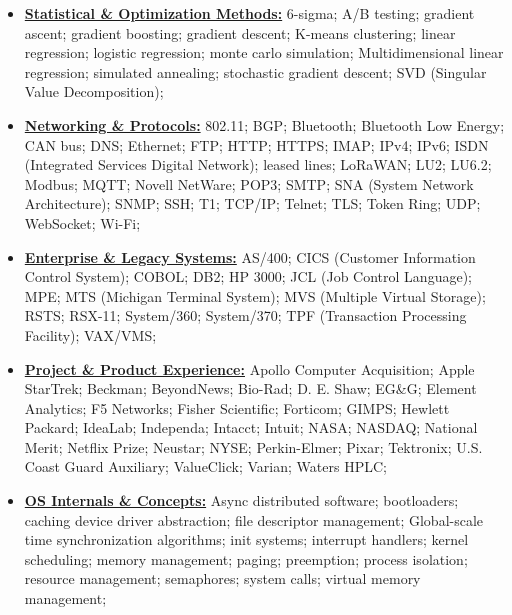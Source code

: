 \documentclass[letterpaper,11pt]{article}
\begin{document}
{\begin{itemize}[leftmargin=0.1in, label={}, itemsep=0pt, parsep=0pt, topsep=0pt, partopsep=0pt]
HDMI;
jitter;
latency;
NVENC;
OpenGL;
sound card drivers;
VGA drivers;
Video Capture;
Video Capture Card Drivers;
Video Capture Cards;
Video Compression;
Video Decompression;
video pipeline;
video transcoding;
WebRTC;
YUV;
\item
\textbf{\underline{Statistical \& Optimization Methods:}} \hspace{0pt}
6-sigma;
A/B testing;
gradient ascent;
gradient boosting;
gradient descent;
K-means clustering;
linear regression;
logistic regression;
monte carlo simulation;
Multidimensional linear regression;
simulated annealing;
stochastic gradient descent;
SVD (Singular Value Decomposition);
\item
\textbf{\underline{Networking \& Protocols:}} \hspace{0pt}
802.11;
BGP;
Bluetooth;
Bluetooth Low Energy;
CAN bus;
DNS;
Ethernet;
FTP;
HTTP;
HTTPS;
IMAP;
IPv4;
IPv6;
ISDN (Integrated Services Digital Network);
leased lines;
LoRaWAN;
LU2;
LU6.2;
Modbus;
MQTT;
Novell NetWare;
POP3;
SMTP;
SNA (System Network Architecture);
SNMP;
SSH;
T1;
TCP/IP;
Telnet;
TLS;
Token Ring;
UDP;
WebSocket;
Wi-Fi;

\item
\textbf{\underline{Enterprise \& Legacy Systems:}} \hspace{0pt}
AS/400;
CICS (Customer Information Control System);
COBOL;
DB2;
HP 3000;
JCL (Job Control Language);
MPE;
MTS (Michigan Terminal System);
MVS (Multiple Virtual Storage);
RSTS;
RSX-11;
System/360;
System/370;
TPF (Transaction Processing Facility);
VAX/VMS;

\item
\textbf{\underline{Project \& Product Experience:}} \hspace{0pt}
Apollo Computer Acquisition;
Apple StarTrek;
Beckman;
BeyondNews;
Bio-Rad;
D. E. Shaw;
EG\&G;
Element Analytics;
F5 Networks;
Fisher Scientific;
Forticom;
GIMPS;
Hewlett Packard;
IdeaLab;
Independa;
Intacct;
Intuit;
NASA;
NASDAQ;
National Merit;
Netflix Prize;
Neustar;
NYSE;
Perkin-Elmer;
Pixar;
Tektronix;
U.S. Coast Guard Auxiliary;
ValueClick;
Varian;
Waters HPLC;

\item
\textbf{\underline{OS Internals \& Concepts:}} \hspace{0pt}
Async distributed software;
bootloaders;
caching
device driver abstraction;
file descriptor management;
Global-scale time synchronization algorithms;
init systems;
interrupt handlers;
kernel scheduling;
memory management;
paging;
preemption;
process isolation;
resource management;
semaphores;
system calls;
virtual memory management;


\end{itemize}}
\end{document}

